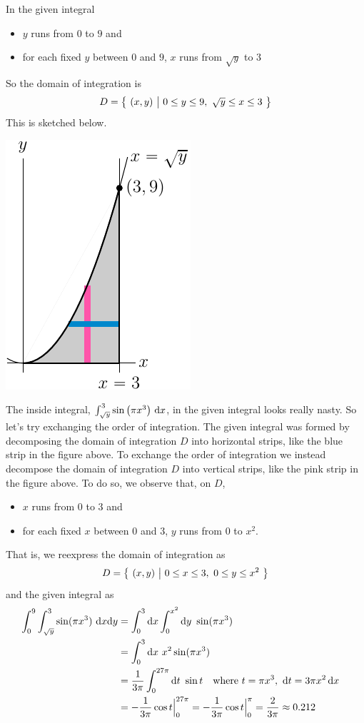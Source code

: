 \begin{solution}
In the given integral
\begin{itemize}
\item 
$y$ runs from $0$ to $9$ and
\item
for each fixed $y$ between $0$ and $9$, $x$ runs from $\sqrt{y}$ to $3$
\end{itemize}
So the domain of integration is 
\begin{equation*}
D = \big\{ \ (x,y)\ \big|\ 0\le y\le 9,\  \sqrt{y}\le x\le 3\ \big\}
\end{equation*}
This is sketched below. 
\begin{center}
     \includegraphics{fig/OE01DQ6.pdf}
\end{center}
The inside integral, $\int_{\sqrt{y}}^3\sin\big(\pi x^3\big)\ \dee{x}$,
in the given integral looks really nasty.  So let's try exchanging
the order of integration. The given integral was formed by decomposing
the domain of integration $D$ into horizontal strips, like the blue strip
in the figure above. To exchange the order of integration we instead
decompose the domain of integration $D$ into vertical strips, 
like the pink strip in the figure above. To do so, we observe that, on $D$,
\begin{itemize}
\item 
$x$ runs from $0$ to $3$ and
\item
for each fixed $x$ between $0$ and $3$, $y$ runs from $0$ to $x^2$.
\end{itemize}
That is, we reexpress the domain of integration as 
\begin{equation*}
D = \big\{ \ (x,y)\ \big|\ 0\le x\le 3,\  0\le y\le x^2\ \big\}
\end{equation*}
and the given integral as
\begin{align*}
\int_0^9\int_{\sqrt{y}}^3\sin(\pi x^3)\ \mathrm{d}x\mathrm{d}y
&=\int_0^3\mathrm{d}x \int_0^{x^2}\mathrm{d}y\ \sin(\pi x^3) \cr
&=\int_0^3\mathrm{d}x \ x^2\sin(\pi x^3)\cr
&=\frac{1}{3\pi}\int_0^{27\pi}\mathrm{d}t\ \sin t\quad\hbox{where }
    t=\pi x^3,\ \mathrm{d}t=3\pi x^2\,\mathrm{d}x\cr
&=-\frac{1}{3\pi}\cos t\Big|_0^{27\pi}=-\frac{1}{3\pi}\cos t\Big|_0^\pi
=\frac{2}{3\pi}\approx 0.212
\end{align*}
\end{solution}

